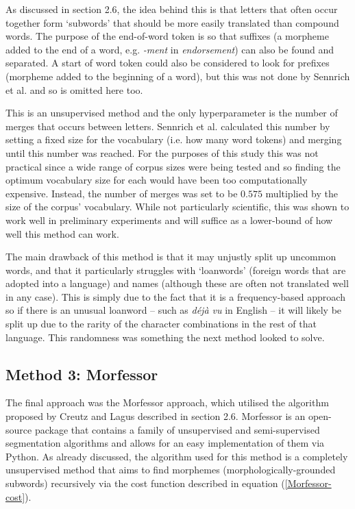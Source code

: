 \documentclass[11pt]{article}
\begin{document}
\bigskip

As discussed in section 2.6, the idea behind this is that letters that often occur together form ‘subwords’ that should be more easily translated than compound words. The purpose of the end-of-word token is so that suffixes (a morpheme added to the end of a word, e.g. \textit{-ment} in \textit{endorsement}) can also be found and separated. A start of word token could also be considered to look for prefixes (morpheme added to the beginning of a word), but this was not done by Sennrich et al. and so is omitted here too.

\bigskip

This is an unsupervised method and the only hyperparameter is the number of merges that occurs between letters. Sennrich et al. \citeyearpar{sennrich-etal-2016-neural} calculated this number by setting a fixed size for the vocabulary (i.e. how many word tokens) and merging until this number was reached. For the purposes of this study this was not practical since a wide range of corpus sizes were being tested and so finding the optimum vocabulary size for each would have been too computationally expensive. Instead, the number of merges was set to be $0.575$ multiplied by the size of the corpus’ vocabulary. While not particularly scientific, this was shown to work well in preliminary experiments and will suffice as a lower-bound of how well this method can work.

\bigskip

The main drawback of this method is that it may unjustly split up uncommon words, and that it particularly struggles with `loanwords' (foreign words that are adopted into a language) and names (although these are often not translated well in any case). This is simply due to the fact that it is a frequency-based approach so if there is an unusual loanword -- such as \textit{déjà vu} in English -- it will likely be split up due to the rarity of the character combinations in the rest of that language. This randomness was something the next method looked to solve.

\subsection{Method 3: Morfessor}

The final approach was the Morfessor approach, which utilised the algorithm proposed by Creutz and Lagus \citeyearpar{creutz-lagus-2002-unsupervised} described in section 2.6. Morfessor \citep{virpioja2013morfessor} is an open-source package that contains a family of unsupervised and semi-supervised segmentation algorithms and allows for an easy implementation of them via Python. As already discussed, the algorithm used for this method is a completely unsupervised method that aims to find morphemes (morphologically-grounded subwords) recursively via the cost function described in equation (\ref{Morfessor-cost}).
\end{document}
